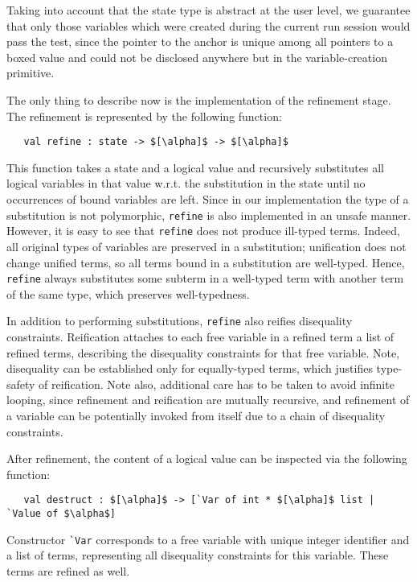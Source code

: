 Taking into account that the state type is abstract at the user level, we guarantee that only those variables which were
created during the current run session would pass the test, since the pointer to the anchor is unique among all pointers to a boxed value
and could not be disclosed anywhere but in the variable-creation primitive.

The only thing to describe now is the implementation of the refinement stage. The refinement is represented by the following
function:

\begin{lstlisting}
   val refine : state -> $[\alpha]$ -> $[\alpha]$
\end{lstlisting}

This function takes a state and a logical value and recursively substitutes all logical variables in that value w.r.t.
the substitution in the state until no occurrences of bound variables are left. Since in our implementation the type of a substitution is
not polymorphic, \lstinline{refine} is also implemented in an unsafe manner. However, it is easy to see that \lstinline{refine}
does not produce ill-typed terms. Indeed, all original types of variables are preserved in a substitution; unification does not
change unified terms, so all terms bound in a substitution are well-typed. Hence, \lstinline{refine} always substitutes
some subterm in a well-typed term with another term of the same type, which preserves well-typedness.

In addition to performing substitutions, \lstinline{refine} also reifies disequality constraints. Reification
attaches to each free variable in a refined term a list of refined terms, describing the disequality constraints for that
free variable. Note, disequality can be established only for equally-typed terms, which justifies type-safety of reification.
Note also, additional care has to be taken to avoid infinite looping, since refinement and reification are
mutually recursive, and refinement of a variable can be potentially invoked from itself due to a chain of disequality
constraints.

After refinement, the content of a logical value can be inspected via the following function:

\begin{lstlisting}
   val destruct : $[\alpha]$ -> [`Var of int * $[\alpha]$ list | `Value of $\alpha$]
\end{lstlisting}

Constructor \lstinline{`Var} corresponds to a free variable with unique integer identifier and a list of terms,
representing all disequality constraints for this variable. These terms are refined as well.

